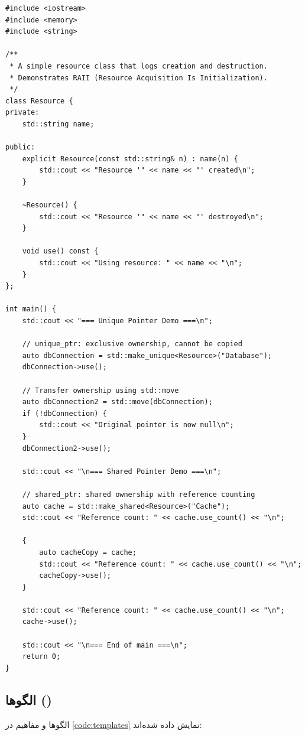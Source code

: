 \documentclass{matinbook}
\begin{document}
\begin{latin}
\begin{verbatim}
#include <iostream>
#include <memory>
#include <string>

/**
 * A simple resource class that logs creation and destruction.
 * Demonstrates RAII (Resource Acquisition Is Initialization).
 */
class Resource {
private:
    std::string name;

public:
    explicit Resource(const std::string& n) : name(n) {
        std::cout << "Resource '" << name << "' created\n";
    }

    ~Resource() {
        std::cout << "Resource '" << name << "' destroyed\n";
    }

    void use() const {
        std::cout << "Using resource: " << name << "\n";
    }
};

int main() {
    std::cout << "=== Unique Pointer Demo ===\n";

    // unique_ptr: exclusive ownership, cannot be copied
    auto dbConnection = std::make_unique<Resource>("Database");
    dbConnection->use();

    // Transfer ownership using std::move
    auto dbConnection2 = std::move(dbConnection);
    if (!dbConnection) {
        std::cout << "Original pointer is now null\n";
    }
    dbConnection2->use();

    std::cout << "\n=== Shared Pointer Demo ===\n";

    // shared_ptr: shared ownership with reference counting
    auto cache = std::make_shared<Resource>("Cache");
    std::cout << "Reference count: " << cache.use_count() << "\n";

    {
        auto cacheCopy = cache;
        std::cout << "Reference count: " << cache.use_count() << "\n";
        cacheCopy->use();
    }

    std::cout << "Reference count: " << cache.use_count() << "\n";
    cache->use();

    std::cout << "\n=== End of main ===\n";
    return 0;
}
\end{verbatim}
\end{latin}
\label{code:smart-pointers}

\subsection{الگوها ()}
\label{sec:cpp-templates}

الگوها و مفاهیم  در \cref{code:templates}
نمایش داده شده‌اند:
\end{document}
